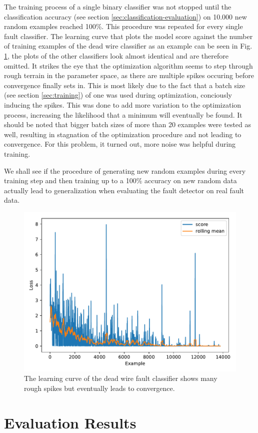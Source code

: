 The training process of a single binary classifier was not stopped
until the classification accuracy (see section
\ref{sec:classification-evaluation}) on 10.000 new random examples
reached 100\%. This procedure was repeated for every single fault
classifier. The learning curve that plots the model score against the
number of training examples of the dead wire classifier as an example
can be seen in Fig. \ref{fig:learning-curve}, the plots of the other
classifiers look almost identical and are therefore omitted. It
strikes the eye that the optimization algorithm seems to step through
rough terrain in the parameter space, as there are multiple spikes
occuring before convergence finally sets in. This is most likely due
to the fact that a batch size (see section \ref{sec:training}) of one
was used during optimization, conciously inducing the spikes. This was
done to add more variation to the optimization process, increasing
the likelihood that a minimum will eventually be found. It should be
noted that bigger batch sizes of more than 20 examples were tested as
well, resulting in stagnation of the optimization procedure and not
leading to convergence. For this problem, it turned out, more noise
was helpful during training.

We shall see if the procedure of generating new random examples during every
training step and then training up to a 100\% accuracy on new random
data actually lead to generalization when evaluating the fault
detector on real fault data.

\begin{figure}[h]
  \centering
  \includegraphics[width=.8\textwidth]{../figures/score_test}
  \caption{The learning curve of the dead wire fault classifier
    shows many rough spikes but eventually leads to convergence.}
  \label{fig:learning-curve}
\end{figure}

\section{Evaluation Results}
